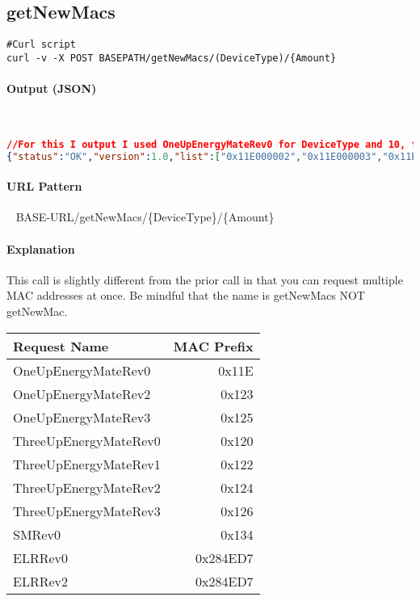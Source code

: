 \documentclass[
10pt, %
letterpaper, %
oneside, %
headinclude,footinclude, %
BCOR5mm, %
]{scrartcl}
\begin{document}

\subsection{getNewMacs}
\begin{lstlisting}
#Curl script 
curl -v -X POST BASEPATH/getNewMacs/(DeviceType)/{Amount}
\end{lstlisting}

\paragraph{Output (JSON)}~
\begin{lstlisting}[language=json]
//For this I output I used OneUpEnergyMateRev0 for DeviceType and 10, for Amount
{"status":"OK","version":1.0,"list":["0x11E000002","0x11E000003","0x11E000004","0x11E000005","0x11E000006","0x11E000007","0x11E000008","0x11E000009","0x11E00000A","0x11E00000B"]}
\end{lstlisting}

\paragraph{URL Pattern} 
~\newline
BASE-URL/getNewMacs/\{DeviceType\}/\{Amount\}

\paragraph{Explanation}
This call is slightly different from the prior call in that you can request multiple MAC addresses at once. Be mindful that the name is getNewMacs NOT getNewMac. 
~\newline
\begin{tabular}{| l | r |}
\hline
\textbf{Request Name} & \textbf{MAC Prefix} \\
\hline
OneUpEnergyMateRev0 & 0x11E \\
OneUpEnergyMateRev2 & 0x123 \\
OneUpEnergyMateRev3 & 0x125 \\
ThreeUpEnergyMateRev0 & 0x120 \\
ThreeUpEnergyMateRev1 & 0x122 \\
ThreeUpEnergyMateRev2 & 0x124 \\
ThreeUpEnergyMateRev3 & 0x126 \\
SMRev0 & 0x134 \\
ELRRev0 &  0x284ED7 \\
ELRRev2 & 0x284ED7 \\
\hline
\end{tabular}
\end{document}

